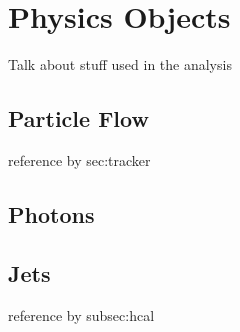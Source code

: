 \chapter{Physics Objects\label{ch:objects}}

Talk about stuff used in the analysis

\section{Particle Flow\label{sec:PF}}
reference by sec:tracker

\section{Photons}

\section{Jets\label{sec:jets}}
reference by subsec:hcal
